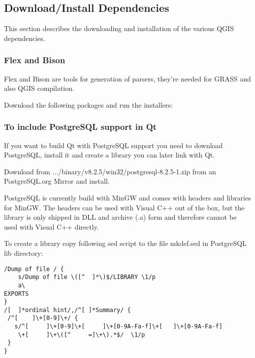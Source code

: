 \subsection{Download/Install Dependencies}
This section describes the downloading and installation of the various QGIS dependencies.

\subsubsection{Flex and Bison}
Flex and Bison are tools for generation of parsers, they're needed for GRASS and also QGIS compilation.

Download the following packages and run the installers:

	\begin{quotation}
	\end{quotation}

	\begin{quotation}
	\end{quotation}

\subsubsection{To include  PostgreSQL support in Qt}
If you want to build Qt with PostgreSQL support you need to download
PostgreSQL, install it and create a library you can later link with Qt.

Download from .../binary/v8.2.5/win32/postgresql-8.2.5-1.zip from an
PostgreSQL.org Mirror and install.

PostgreSQL is currently build with MinGW and comes with headers and libraries
for MinGW.  The headers can be used with Visual C++ out of the box, but the library
is only shipped in DLL and archive (.a) form and therefore cannot be used with
Visual C++ directly.

To create a library copy following sed script to the file mkdef.sed in
PostgreSQL lib directory:

\begin{verbatim}
/Dump of file / {
	s/Dump of file \([^	 ]*\)$/LIBRARY \1/p
	a\
EXPORTS
}
/[ 	]*ordinal hint/,/^[	]*Summary/ {
 /^[ 	]\+[0-9]\+/ {
   s/^[ 	]\+[0-9]\+[ 	]\+[0-9A-Fa-f]\+[ 	]\+[0-9A-Fa-f]
    \+[ 	]\+\([^ 	=]\+\).*$/	\1/p
 }
}
\end{verbatim}

